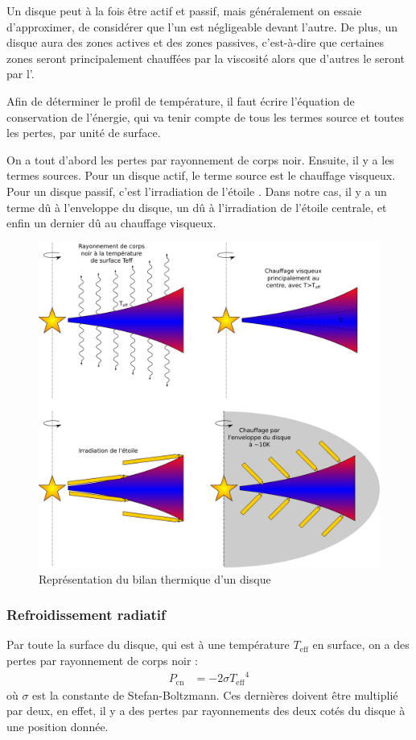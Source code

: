 Un disque peut à la fois être actif et passif, mais généralement on essaie d'approximer, de considérer que l'un est négligeable devant l'autre. De plus, un disque aura des zones actives et des zones passives, c'est-à-dire que certaines zones seront principalement chauffées par la viscosité alors que d'autres le seront par l'.

\bigskip

Afin de déterminer le profil de température, il faut écrire l'équation de conservation de l'énergie, qui va tenir compte de tous les termes source et toutes les pertes, par unité de surface.

On a tout d'abord les pertes par rayonnement de corps noir. Ensuite, il y a les termes sources. Pour un disque actif, le terme source est le chauffage visqueux. Pour un disque passif, c'est l'irradiation de l'étoile \citep{chiang1997spectral}. Dans notre cas, il y a un terme dû à l'enveloppe du disque, un dû à l'irradiation de l'étoile centrale, et enfin un dernier dû au chauffage visqueux.


\begin{figure}[htbp]
\centering
\includegraphics[width=0.65\linewidth]{figure/disk_energy.pdf}
\caption[Bilan énergétique d'un disque.]{Représentation du bilan thermique d'un disque}\label{fig:energy_equilibrium}
\end{figure}

\subsubsection{Refroidissement radiatif}
Par toute la surface du disque, qui est à une température $T_\text{eff}$ en surface, on a des pertes par rayonnement de corps noir : 
\begin{align}
P_\text{cn} &= - 2\sigma {T_\text{eff}}^4
\end{align}
où $\sigma$ est la constante de Stefan-Boltzmann. Ces dernières doivent être multiplié par deux, en effet, il y a des pertes par rayonnements des deux cotés du disque à une position donnée. 

